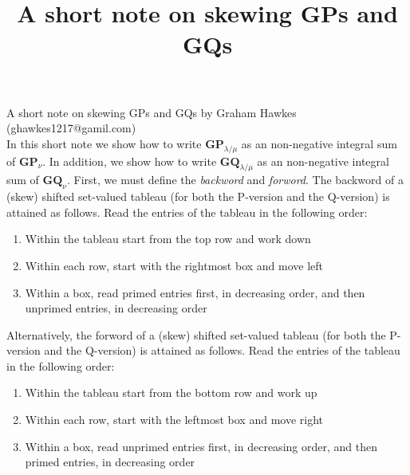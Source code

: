 \documentclass[]{amsart}
\theoremstyle{definition}
\begin{document}
\title[A short note on skewing GPs and GQs]{A short note on skewing GPs and GQs}











\noindent A short note on skewing GPs and GQs by Graham Hawkes (ghawkes1217@gamil.com)\\



In this short note we show how to write $\mathbf{GP}_{\lambda/\mu}$ as an non-negative integral sum of $\mathbf{GP}_{\nu}$.  In addition, we show how to write $\mathbf{GQ}_{\lambda/\mu}$ as an non-negative integral sum of $\mathbf{GQ}_{\nu}$.  First, we must define the \emph{backword} and \emph{forword}.  The backword of a (skew) shifted set-valued tableau (for both the P-version and the Q-version) is attained as follows.  Read the entries of the tableau in the following order:

\begin{enumerate}
\item Within the tableau start from the top row and work down
\item Within each row, start with the rightmost box and move left
\item  Within a box, read primed entries first, in decreasing order, and then unprimed entries, in decreasing order
\end{enumerate}


 Alternatively, the forword of a (skew) shifted set-valued tableau (for both the P-version and the Q-version) is attained as follows.  Read the entries of the tableau in the following order:

\begin{enumerate}
\item Within the tableau start from the bottom row and work up
\item Within each row, start with the leftmost box and move right
\item Within a box, read unprimed entries first, in decreasing order, and then primed entries, in decreasing order
\end{enumerate}
\end{document}
